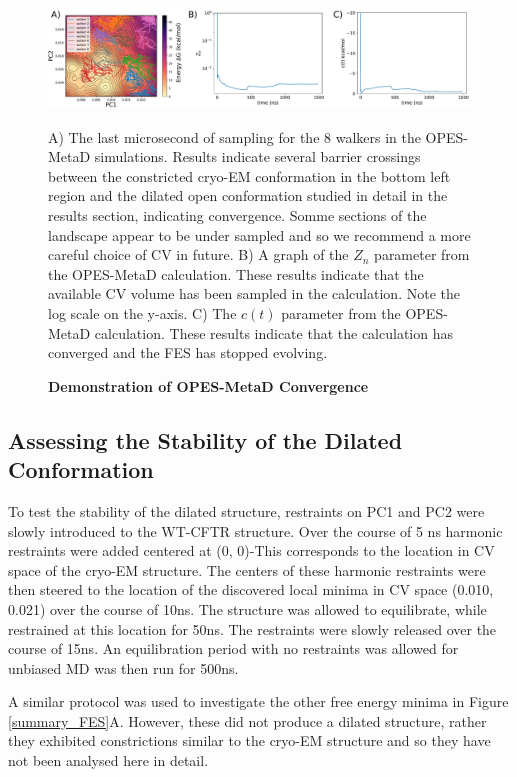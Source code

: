 \begin{figure}
	\begin{center}
		\includegraphics[width=1\textwidth]{figures/opening/FES_mw_trace.pdf}
	\end{center}
	\captionsetup{singlelinecheck = false, justification=raggedright}
	\caption[Demonstration of OPES-MetaD Convergence ] {\textbf{Demonstration of OPES-MetaD Convergence}}{A) The last microsecond of sampling for the 8 walkers in the OPES-MetaD simulations. Results indicate several barrier crossings between the constricted cryo-EM conformation in the bottom left region and the dilated open conformation studied in detail in the results section, indicating convergence. Somme sections of the landscape appear to be under sampled and so we recommend a more careful choice of CV in future. B) A graph of the $Z_n$ parameter from the OPES-MetaD calculation. These results indicate that the available CV volume has been sampled in the calculation. Note the log scale on the y-axis. C) The $c(t)$ parameter from the OPES-MetaD calculation. These results indicate that the calculation has converged and the FES has stopped evolving. }
	\label{convergence_3}
\end{figure}

\subsection{Assessing the Stability of the Dilated Conformation}
To test the stability of the dilated structure, restraints on PC1 and PC2 were slowly introduced to the WT-CFTR structure. Over the course of 5 ns harmonic restraints were added centered at (0, 0)-This corresponds to the location in CV space of the cryo-EM structure. The centers of these harmonic restraints were then steered to the location of the discovered local minima in CV space (0.010, 0.021) over the course of 10ns. The structure was allowed to equilibrate, while restrained at this location for 50ns. The restraints were slowly released over the course of 15ns. An equilibration period with no restraints was allowed for  unbiased MD was then run for 500ns.

A similar protocol was used to investigate the other free energy minima in Figure \ref{summary_FES}A. However, these did not produce a dilated structure, rather they exhibited constrictions similar to the cryo-EM structure and so they have not been analysed here in detail.

